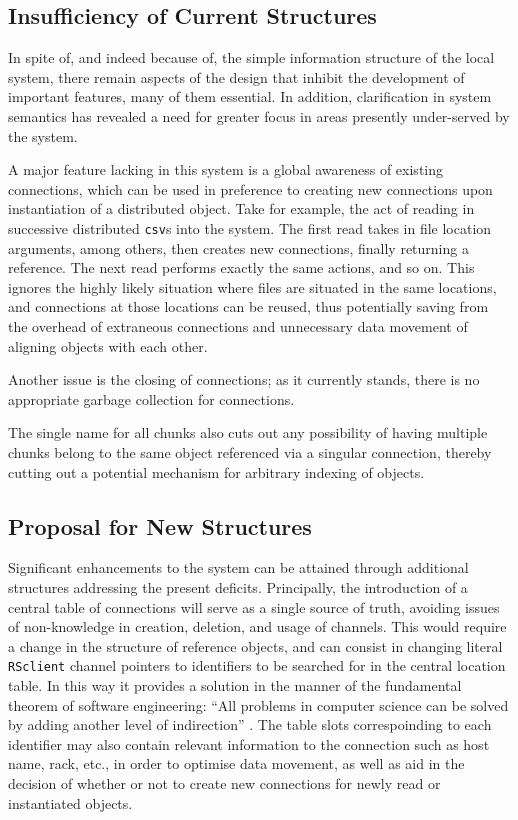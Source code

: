 \documentclass[a4paper]{article}
\begin{document}
\subsection{Insufficiency of Current Structures}
In spite of, and indeed because of, the simple information structure of the
local system, there remain aspects of the design that inhibit the development
of important features, many of them essential.
In addition, clarification in system semantics has revealed a need for greater
focus in areas presently under-served by the system.

A major feature lacking in this system is a global awareness of existing
connections, which can be used in preference to creating new connections upon
instantiation of a distributed object.
Take for example, the act of reading in successive distributed \texttt{csv}s
into the system.
The first read takes in file location arguments, among others, then creates new
connections, finally returning a reference.
The next read performs exactly the same actions, and so on.
This ignores the highly likely situation where files are situated in the same
locations, and connections at those locations can be reused, thus potentially
saving from the overhead of extraneous connections and unnecessary data
movement of aligning objects with each other.

Another issue is the closing of connections; as it currently stands, there is
no appropriate garbage collection for connections.

The single name for all chunks also cuts out any possibility of having multiple
chunks belong to the same object referenced via a singular connection, thereby
cutting out a potential mechanism for arbitrary indexing of objects.

\subsection{Proposal for New Structures}
\label{localproposal}
Significant enhancements to the system can be attained through additional
structures addressing the present deficits.
Principally, the introduction of a central table of connections will serve as a
single source of truth, avoiding issues of non-knowledge in creation, deletion,
and usage of channels.
This would require a change in the structure of reference objects, and can
consist in changing literal \texttt{RSclient} channel pointers to identifiers
to be searched for in the central location table.
In this way it provides a solution in the manner of the fundamental theorem of
software engineering: ``All problems in computer science can be solved by
adding another level of indirection'' \cite{oram2007beautiful}.
The table slots correspoinding to each identifier may also contain relevant
information to the connection such as host name, rack, etc., in order to
optimise data movement, as well as aid in the decision of whether or not to
create new connections for newly read or instantiated objects.
\end{document}
